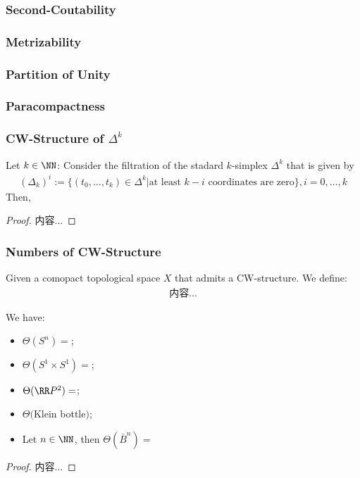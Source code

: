 \documentclass[Total.tex]{subfiles}
\begin{document}
	\subsubsection{Second-Coutability}
	\subsubsection{Metrizability}
	\subsubsection{Partition of Unity}
	\subsubsection{Paracompactness}
	\subsubsection{CW-Structure of $\Delta^k$}
	\begin{proposition}
		Let $k\in \NN$: Consider the filtration of the stadard $k$-simplex $\Delta^k$ that is given by
		\begin{gather*}
			(\Delta_k)^i:=\{(t_0,\dots,t_k)\in \Delta^k|\mbox{at least }k-i\mbox{ coordinates are zero}\},i=0,\dots,k
		\end{gather*}
		Then, 
	\end{proposition}
	\begin{proof}
		内容...
	\end{proof}
	\subsubsection{Numbers of CW-Structure}
	\begin{Def}
		Given a comopact topological space $X$ that admits a CW-structure. We define:
		\begin{gather*}
			内容...
		\end{gather*}
	\end{Def}
	\begin{proposition}
		We have:
		\begin{itemize}
			\item $\Theta(S^n)=$;
			\item $\Theta(S^1\times S^1)=$;
			\item $\Theta(\RR P^2)=$;
			\item $\Theta($Klein bottle$)$;
			\item Let $n\in \NN$, then $\Theta(\bar{B}^n)=$
		\end{itemize}
	\end{proposition}
	\begin{proof}
		内容...
	\end{proof}
\end{document}

